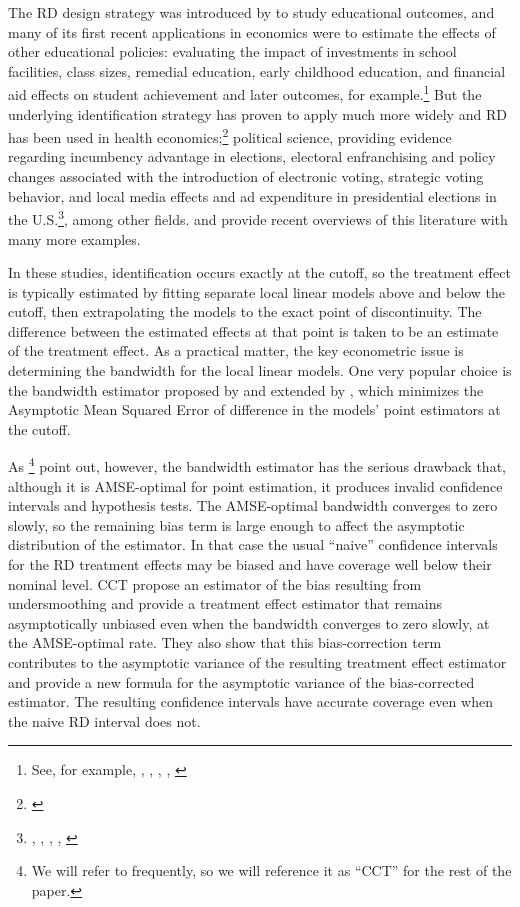 \documentclass[12pt,fleqn]{article}
\begin{document}
The RD design strategy was introduced by \cite{thistlethwaite1960} to study
educational outcomes, and many of its first recent applications in economics
were to estimate the effects of other educational policies: evaluating the
impact of investments in school facilities, class sizes, remedial education,
early childhood education, and financial aid effects on student achievement and
later outcomes, for example.\footnote{%
  See, for example, \cite{vdk2002}, \cite{jacoblefgren2004}, \cite{ludwig2007},
  \cite{urquiola2009}, \cite{cellini2010}} %
But the underlying identification strategy has proven to apply much more widely
and RD has been used in health economics;\footnote{%
  \cite{Card2009,barreca2011saving}} %
political science, providing evidence regarding incumbency advantage in
elections, electoral enfranchising and policy changes associated with the
introduction of electronic voting, strategic voting behavior, and local media
effects and ad expenditure in presidential elections in the U.S.\footnote{%
  \cite{lee2008}, \cite{Caughey2011}, \cite{keele2014geographic},
  \cite{erikson2015}, \cite{Fujiwara2011,Fujiwara2015}}, %
among other fields. \cite{imbens2008} and \cite{lee2010} provide recent
overviews of this literature with many more examples.

In these studies, identification occurs exactly at the cutoff, so the
treatment effect is typically estimated by fitting separate local linear models
above and below the cutoff, then extrapolating the models to the exact point of
discontinuity. The difference between the estimated effects at that point is
taken to be an estimate of the treatment effect. As a practical matter, the key
econometric issue is determining the bandwidth for the local linear models.  One
very popular choice is the bandwidth estimator proposed by \cite{IK} and
extended by \cite{calonico2014}, which minimizes the Asymptotic Mean Squared
Error of difference in the models' point estimators at the cutoff.

As \cite{calonico2014}\footnote{%
  We will refer to \cite{calonico2014} frequently, so we will reference it as
  ``CCT'' for the rest of the paper.} %
point out, however, the \cite{IK} bandwidth estimator has the serious drawback
that, although it is AMSE-optimal for point estimation, it produces invalid
confidence intervals and hypothesis tests. The AMSE-optimal bandwidth
converges to zero slowly, so the remaining bias term is large enough to affect
the asymptotic distribution of the estimator. In that case the usual ``naive''
confidence intervals for the RD treatment effects may be biased and have
coverage well below their nominal level.
CCT propose an estimator of the bias resulting from undersmoothing and provide a
treatment effect estimator that remains asymptotically unbiased even when the
bandwidth converges to zero slowly, at the AMSE-optimal rate. They also show
that this bias-correction term contributes to the asymptotic variance of the
resulting treatment effect estimator and provide a new formula for the
asymptotic variance of the bias-corrected estimator. The resulting confidence
intervals have accurate coverage even when the naive RD interval does not.
\end{document}
